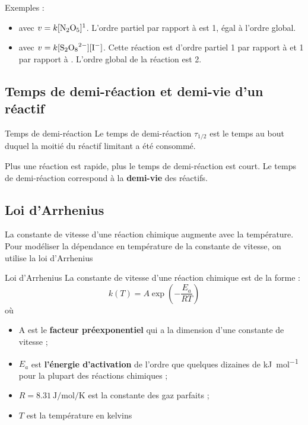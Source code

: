 \documentclass{cours}
\begin{document}
Exemples :
\begin{itemize}
  \item {} avec $v=k[\ce{N2O5}]^1$. L'ordre partiel par rapport à  est 1, égal à l'ordre global.

  \item {} avec $v=k[\ce{S2O8^{2-}}][\ce{I-}]$. Cette réaction est d'ordre partiel 1 par rapport à  et 1 par rapport à . L'ordre global de la réaction est 2. 
\end{itemize}



\subsection{Temps de demi-réaction et demi-vie d'un réactif}%
\label{sub:temps_de_demi-réactiono}
\begin{loi}{Temps de demi-réaction}
  Le temps de demi-réaction $\tau_{1/2}$ est le temps au bout duquel la moitié du réactif limitant a été consommé.
\end{loi}

Plus une réaction est rapide, plus le temps de demi-réaction est court. Le temps de demi-réaction correspond à la \textbf{demi-vie} des réactifs.

\subsection{Loi d'Arrhenius}%
\label{sub:loi_d_arrhenius}
La constante de vitesse d'une réaction chimique augmente avec la température. Pour modéliser la dépendance en température de la constante de vitesse, on utilise la loi d'Arrhenius
\begin{loi}{Loi d'Arrhenius}
La constante de vitesse d'une réaction chimique est de la forme :
\[
k(T) = A\exp\left( -\frac{E_a}{RT} \right)  
\]
où 
\begin{itemize}
  \item A est le \textbf{facteur préexponentiel} qui a la dimension d'une constante de vitesse ;
  \item $E_a$ est \textbf{l'énergie d'activation} de l'ordre que quelques dizaines de \si{\kilo\joule\per\mole} pour la plupart des réactions chimiques ;
  \item $R=\SI{8.31}{\joule\per\mol\per\kelvin}$ est la constante des gaz parfaits ;
  \item $T$ est la température en kelvins
\end{itemize}
\end{loi}
\end{document}
